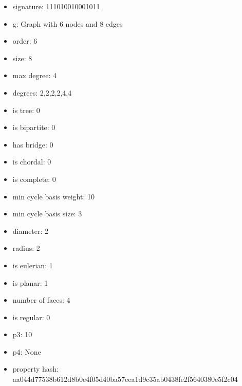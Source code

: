 \begin{itemize}
\item signature: 111010010001011
\item g: Graph with 6 nodes and 8 edges
\item order: 6
\item size: 8
\item max degree: 4
\item degrees: 2,2,2,2,4,4
\item is tree: 0
\item is bipartite: 0
\item has bridge: 0
\item is chordal: 0
\item is complete: 0
\item min cycle basis weight: 10
\item min cycle basis size: 3
\item diameter: 2
\item radius: 2
\item is eulerian: 1
\item is planar: 1
\item number of faces: 4
\item is regular: 0
\item p3: 10
\item p4: None
\item property hash: aa044d77538b612d8b0e4f05d40ba57eea1d9c35ab0438fe2f5640380e5f2c04
\end{itemize}
\newpage
\begin{figure}
\end{figure}

